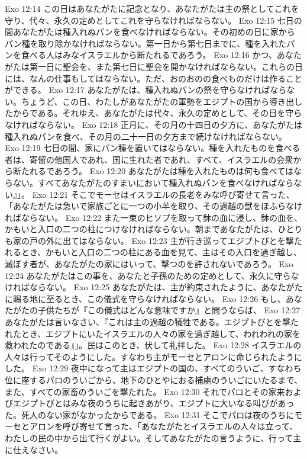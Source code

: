 Exo 12:14  この日はあなたがたに記念となり、あなたがたは主の祭としてこれを守り、代々、永久の定めとしてこれを守らなければならない。
Exo 12:15  七日の間あなたがたは種入れぬパンを食べなければならない。その初めの日に家からパン種を取り除かなければならない。第一日から第七日までに、種を入れたパンを食べる人はみなイスラエルから断たれるであろう。
Exo 12:16  かつ、あなたがたは第一日に聖会を、また第七日に聖会を開かなければならない。これらの日には、なんの仕事もしてはならない。ただ、おのおのの食べものだけは作ることができる。
Exo 12:17  あなたがたは、種入れぬパンの祭を守らなければならない。ちょうど、この日、わたしがあなたがたの軍勢をエジプトの国から導き出したからである。それゆえ、あなたがたは代々、永久の定めとして、その日を守らなければならない。
Exo 12:18  正月に、その月の十四日の夕方に、あなたがたは種入れぬパンを食べ、その月の二十一日の夕方まで続けなければならない。
Exo 12:19  七日の間、家にパン種を置いてはならない。種を入れたものを食べる者は、寄留の他国人であれ、国に生れた者であれ、すべて、イスラエルの会衆から断たれるであろう。
Exo 12:20  あなたがたは種を入れたものは何も食べてはならない。すべてあなたがたのすまいにおいて種入れぬパンを食べなければならない』」。
Exo 12:21  そこでモーセはイスラエルの長老をみな呼び寄せて言った、「あなたがたは急いで家族ごとに一つの小羊を取り、その過越の獣をほふらなければならない。
Exo 12:22  また一束のヒソプを取って鉢の血に浸し、鉢の血を、かもいと入口の二つの柱につけなければならない。朝まであなたがたは、ひとりも家の戸の外に出てはならない。
Exo 12:23  主が行き巡ってエジプトびとを撃たれるとき、かもいと入口の二つの柱にある血を見て、主はその入口を過ぎ越し、滅ぼす者が、あなたがたの家にはいって、撃つのを許されないであろう。
Exo 12:24  あなたがたはこの事を、あなたと子孫のための定めとして、永久に守らなければならない。
Exo 12:25  あなたがたは、主が約束されたように、あなたがたに賜る地に至るとき、この儀式を守らなければならない。
Exo 12:26  もし、あなたがたの子供たちが『この儀式はどんな意味ですか』と問うならば、
Exo 12:27  あなたがたは言いなさい、『これは主の過越の犠牲である。エジプトびとを撃たれたとき、エジプトにいたイスラエルの人々の家を過ぎ越して、われわれの家を救われたのである』」。民はこのとき、伏して礼拝した。
Exo 12:28  イスラエルの人々は行ってそのようにした。すなわち主がモーセとアロンに命じられたようにした。
Exo 12:29  夜中になって主はエジプトの国の、すべてのういご、すなわち位に座するパロのういごから、地下のひとやにおる捕虜のういごにいたるまで、また、すべての家畜のういごを撃たれた。
Exo 12:30  それでパロとその家来およびエジプトびとはみな夜のうちに起きあがり、エジプトに大いなる叫びがあった。死人のない家がなかったからである。
Exo 12:31  そこでパロは夜のうちにモーセとアロンを呼び寄せて言った、「あなたがたとイスラエルの人々は立って、わたしの民の中から出て行くがよい。そしてあなたがたの言うように、行って主に仕えなさい。
